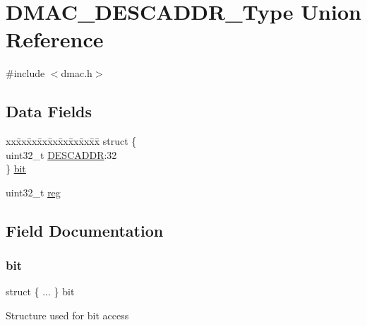 \hypertarget{union_d_m_a_c___d_e_s_c_a_d_d_r___type}{}\section{D\+M\+A\+C\+\_\+\+D\+E\+S\+C\+A\+D\+D\+R\+\_\+\+Type Union Reference}
\label{union_d_m_a_c___d_e_s_c_a_d_d_r___type}


{\ttfamily \#include $<$dmac.\+h$>$}

\subsection*{Data Fields}
\begin{DoxyCompactItemize}
\item 
\begin{tabbing}
xx\=xx\=xx\=xx\=xx\=xx\=xx\=xx\=xx\=\kill
struct \{\\
\>uint32\_t \mbox{\hyperlink{union_d_m_a_c___d_e_s_c_a_d_d_r___type_a4d0f7b235427a5948f78a142cb97d2b8}{DESCADDR}}:32\\
\} \mbox{\hyperlink{union_d_m_a_c___d_e_s_c_a_d_d_r___type_a2dfacd6b276f5470583d82e0221deb7a}{bit}}\\

\end{tabbing}\item 
uint32\+\_\+t \mbox{\hyperlink{union_d_m_a_c___d_e_s_c_a_d_d_r___type_a6b91636401516a477989a336376d7b40}{reg}}
\end{DoxyCompactItemize}


\subsection{Field Documentation}
\mbox{\label{union_d_m_a_c___d_e_s_c_a_d_d_r___type_a2dfacd6b276f5470583d82e0221deb7a}} 
\subsubsection{\texorpdfstring{bit}{bit}}
{\footnotesize\ttfamily struct \{ ... \}   bit}

Structure used for bit access \mbox{\label{union_d_m_a_c___d_e_s_c_a_d_d_r___type_a4d0f7b235427a5948f78a142cb97d2b8}} 
